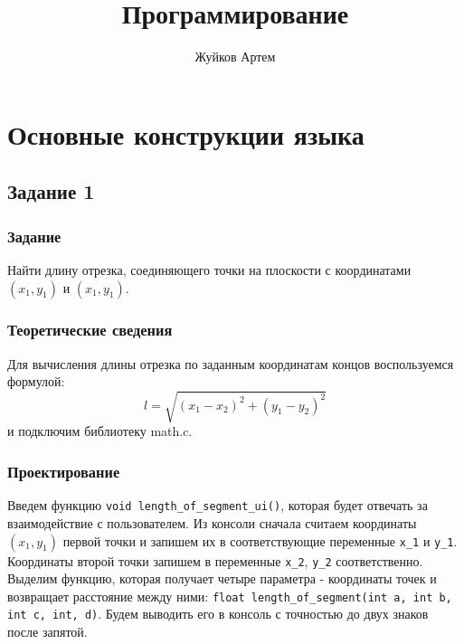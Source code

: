 \documentclass[12pt,a4paper]{report}
\author{Жуйков Артем}
\title{Программирование}
\begin{document}
\listoftodos
\maketitle
\chapter{Основные конструкции языка}
\section{Задание 1}
\subsection{Задание}
Найти длину отрезка, соединяющего точки на плоскости с координатами $(x_1, y_1)$ и $(x_1 , y_1)$.

\subsection{Теоретические сведения}


Для вычисления длины отрезка по заданным координатам концов воспользуемся формулой:
\begin{equation}
l = \sqrt{(x_1 - x_2)^2 + (y_1 - y_2)^2}
\end{equation}
и подключим библиотеку math.c.

\subsection{Проектирование}
Введем функцию \verb+void length_of_segment_ui()+, которая будет отвечать за взаимодействие с пользователем. Из консоли сначала считаем координаты $ (x_1, y_1) $ первой точки и запишем их в соответствующие переменные \verb+х_1+ и \verb+у_1+.
Координаты второй точки запишем в переменные \verb+x_2+, \verb+y_2+ соответственно.
Выделим функцию, которая получает четыре параметра - координаты точек и возвращает расстояние между ними: \verb+float length_of_segment(int a, int b, int c, int, d)+. Будем выводить его в консоль с точностью до двух знаков после запятой.
\end{document}
